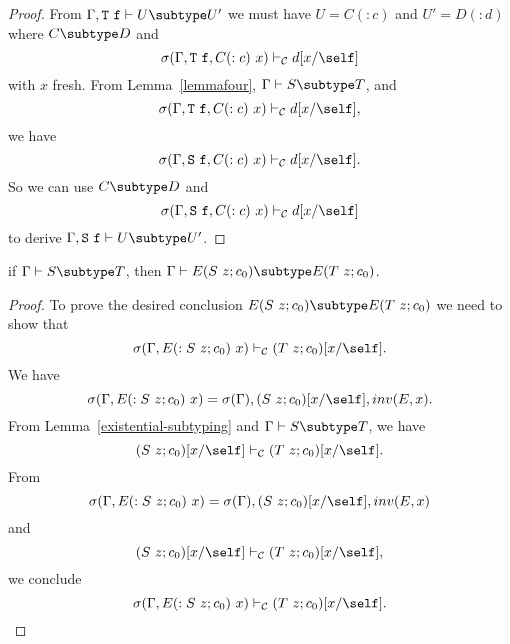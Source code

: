 \begin{proof}
From $\Gamma, {\tt T}\ {\tt f} \vdash U \subtype U'$
we must have $U = C(:c)$ and $U' = D(:d)$
where
$C \subtype D$
and 
$$\sigma(\Gamma, {\tt T}\ {\tt f}, C(:c)~x) \vdash_{\cal C} d[x/\self]$$
with $x$ fresh.
From Lemma~\ref{lemmafour},
$\Gamma \vdash S \subtype T$,
and
$$\sigma(\Gamma, {\tt T}\ {\tt f}, C(:c)~x) \vdash_{\cal C} d[x/\self],$$
we have
$$\sigma(\Gamma, {\tt S}\ {\tt f}, C(:c)~x) \vdash_{\cal C} d[x/\self].$$
So we can use 
$C \subtype D$
and
$$\sigma(\Gamma, {\tt S}\ {\tt f}, C(:c)~x) \vdash_{\cal C} d[x/\self]$$
to derive 
$\Gamma, {\tt S}\ {\tt f} \vdash U \subtype U'$.
\end{proof}

\begin{lemma}
\label{lemmafive} %
if   $\Gamma \vdash S \subtype T$,
then $\Gamma \vdash E(S\ z; c_0) \subtype E(T\ z; c_0)$.
\end{lemma}

\begin{proof}
To prove the desired conclusion $E(S\ z; c_0) \subtype E(T\ z; c_0)$ 
we need to show that
$$\sigma(\Gamma, E(:S\ z; c_0)~x) \vdash_{\cal C} (T\ z; c_0)[x/\self].$$
%
We have 
$$\sigma(\Gamma, E(:S\ z; c_0)~x) = 
 \sigma(\Gamma), (S\ z; c_0)[x/\self], inv(E,x).$$
From Lemma~\ref{existential-subtyping} and
$\Gamma \vdash S \subtype T$, 
we have
$$(S~z; c_0)[x/\self] \vdash_{\cal C} (T~z; c_0)[x/\self].$$
From $$\sigma(\Gamma, E(:S\ z; c_0)~x) =
 \sigma(\Gamma), (S\ z; c_0)[x/\self], inv(E,x)$$
and
$$(S~z; c_0)[x/\self] \vdash_{\cal C} (T~z; c_0)[x/\self],$$
we conclude 
$$\sigma(\Gamma, E(:S\ z; c_0)~x) \vdash_{\cal C} (T\ z; c_0)[x/\self].$$
\end{proof}

